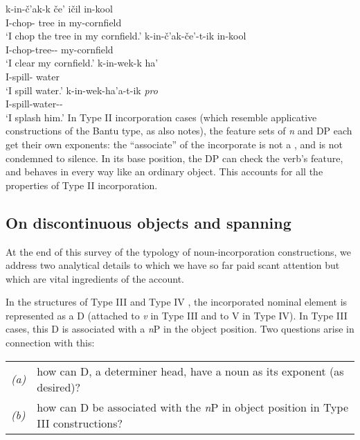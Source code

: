 \documentclass[output=paper]{langsci/langscibook}
\begin{document}
\begin{refcontext}
\ea\label{18}
    \ea \gll k-in-\v{c}'ak-k \v{c}e' i\v{c}il in-kool\\
    \Incmpl{}\normalfont{-}I-chop-\Ipfv{} tree in my-cornfield\\
    \glt \enquote*{I chop the tree in my cornfield.}
    \ex \gll k-in-\v{c}'ak-\v{c}e'-t-ik in-kool\\
    \Incmpl{}\normalfont{-}I-chop-tree-\Tr-\Ipfv{} my-cornfield\\
    \glt \enquote*{I clear my cornfield.}
    \z
\z
\newpage
\ea\label{19}
    \ea \gll k-in-wek-k ha'\\
    \Incmpl{}\normalfont{-}I-spill-\Ipfv{} water\\
    \glt \enquote*{I spill water.}
    \ex \gll k-in-wek-ha'a-t-ik \emph{pro}\\
    \Incmpl{}\normalfont{-}I-spill-water-\Tr-\Ipfv{}\\
    \glt \enquote*{I splash him.}
    \z
\z
In Type II incorporation cases (which resemble applicative constructions of the
Bantu type, as \cite{rosen89} also notes), the feature sets of \emph{n} and DP
each get their own exponents: the \enquote{associate} of the incorporate is
not a , and is not condemned to silence. In its base position,
the DP can check the verb's  feature, and behaves in every way
like an ordinary object. This accounts for all the properties of Type II
incorporation.

\subsection{On discontinuous objects and spanning}
\label{sec:16.2.4}
At the end of this survey of the typology of noun-incorporation constructions, we address two analytical
details to which we have so far paid scant attention but which are vital ingredients of the account.


In the structures of Type III and Type IV , the incorporated nominal
element is represented as a D (attached to \emph{v} in Type III and to V in Type IV). In Type III cases, this
D is associated with a \emph{n}P in the object position. Two questions arise in connection with this:

\vspace{1ex}
\begin{tabularx}{\textwidth}{lX}
\emph{(a)} & how can D, a determiner head, have a noun as its exponent (as desired)?\\
\emph{(b)} & how can D be associated with the \emph{n}P in object position in Type III constructions?\\
\end{tabularx}



\end{refcontext}
\end{document}
